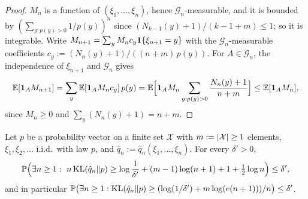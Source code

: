 \begin{proof}
\leanok
{}
$M_n$ is a function of $(\xi_1, \dots, \xi_n)$, hence $\mathcal G_n$-measurable, and it is bounded
by $(\sum_{y : p(y) > 0} 1/p(y))^n$ since $(N_{k-1}(y) + 1)/(k - 1 + m) \le 1$; so it is
integrable. Write $M_{n+1} = \sum_y M_n c_y \mathbf{1}\{\xi_{n+1} = y\}$ with the
$\mathcal G_n$-measurable coefficients $c_y := (N_n(y) + 1)/((n + m)\, p(y))$. For
$A \in \mathcal G_n$, the independence of $\xi_{n+1}$ and $\mathcal G_n$ gives
\[
  \mathbb{E}[\mathbf{1}_A M_{n+1}] = \sum_y \mathbb{E}[\mathbf{1}_A M_n c_y]\, p(y)
  = \mathbb{E}\Big[\mathbf{1}_A M_n \sum_{y : p(y) > 0} \frac{N_n(y) + 1}{n + m}\Big] \le \mathbb{E}[\mathbf{1}_A M_n] ,
\]
since $M_n \ge 0$ and $\sum_y (N_n(y) + 1) = n + m$.
\end{proof}

\begin{lemma}\label{lem:empirical_kl_time_uniform}
\leanok
{}
Let $p$ be a probability vector on a finite set $\mathcal X$ with $m := \lvert \mathcal X \rvert \ge 1$
elements, $\xi_1, \xi_2, \dots$ i.i.d.\ with law $p$, and $\hat q_n := \hat q_n(\xi_1, \dots, \xi_n)$.
For every $\delta' > 0$,
\[
  \mathbb{P}\Big( \exists n \ge 1 :\ n\, \mathrm{KL}(\hat q_n \| p) \ge \log\frac1{\delta'} + (m - 1)\log(n + 1) + 1 + \tfrac12 \log n \Big) \le \delta' ,
\]
and in particular
$\mathbb{P}\big( \exists n \ge 1 : \mathrm{KL}(\hat q_n \| p) \ge (\log(1/\delta') + m \log(e(n + 1)))/n \big) \le \delta'$.
\end{lemma}

